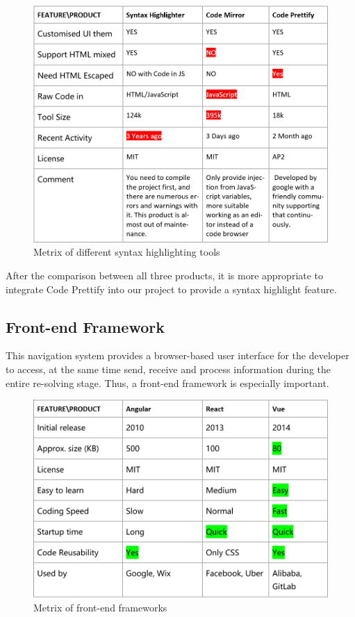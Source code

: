 \documentclass[runningheads]{llncs}
\begin{document}
\begin{figure}[H]
	\centering
	\includegraphics[width=12cm]{pic/highlighter-metrix.png}
	\caption{Metrix of different syntax highlighting tools}
	\label{Metrix of different syntax highlighting tools}
\end{figure}

After the comparison between all three products, it is more appropriate to integrate Code Prettify into our project to provide a syntax highlight feature.

\subsection{Front-end Framework}
This navigation system provides a browser-based user interface for the developer to access, at the same time send, receive and process information during the entire re-solving stage. Thus, a front-end framework is especially important.

\begin{figure}[H]
	\centering
	\includegraphics[width=12cm]{pic/front-end-metrix.png}
	\caption{Metrix of front-end frameworks}
	\label{Metrix of front-end frameworks}
\end{figure}
\end{document}
